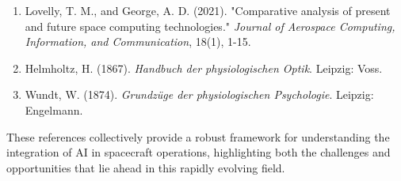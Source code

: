 \documentclass[a4paper,12pt]{article}
\begin{document}
\begin{enumerate}
    \item Lovelly, T. M., and George, A. D. (2021). "Comparative analysis of present and future space computing technologies." \textit{Journal of Aerospace Computing, Information, and Communication}, 18(1), 1-15.

    \item Helmholtz, H. (1867). \textit{Handbuch der physiologischen Optik}. Leipzig: Voss.

    \item Wundt, W. (1874). \textit{Grundzüge der physiologischen Psychologie}. Leipzig: Engelmann.
\end{enumerate}

These references collectively provide a robust framework for understanding the integration of AI in spacecraft operations, highlighting both the challenges and opportunities that lie ahead in this rapidly evolving field.
\end{document}
